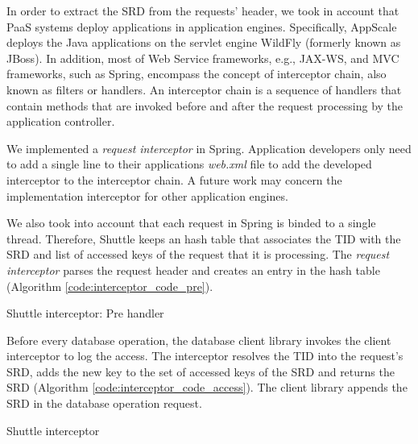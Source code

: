 In order to extract the \ac{SRD} from the requests' header, we took in account that \ac{PaaS} systems deploy applications in application engines. Specifically, AppScale deploys the Java applications on the servlet engine WildFly \cite{wildfly} (formerly known as JBoss). In addition, most of Web Service frameworks, e.g., \ac{JAX-WS}, and \acf{MVC} frameworks, such as Spring, encompass the concept of interceptor chain, also known as filters or handlers. An interceptor chain is a sequence of handlers that contain methods that are invoked before and after the request processing by the application controller.

We implemented a \emph{request interceptor} in Spring. Application developers only need to add a single line to their applications \emph{web.xml} file to add the developed interceptor to the interceptor chain. A future work may concern the implementation interceptor for other application engines.

We also took into account that each request in Spring is binded to a single thread. Therefore, Shuttle keeps an hash table that associates the \acf{TID} with the \acf{SRD} and list of accessed keys of the request that it is processing. The \emph{request interceptor} parses the request header and creates an entry in the hash table (Algorithm \ref{code:interceptor_code_pre}).


\begin{algorithm}
\DontPrintSemicolon{}

	\BlankLine
	\caption{Shuttle interceptor: Pre handler}
	\label{code:interceptor_code_pre}
\end{algorithm}

Before every database operation, the database client library invokes the client interceptor to log the access. The interceptor resolves the \acf{TID} into the request's \ac{SRD}, adds the new key to the set of accessed keys of the \ac{SRD} and returns the \ac{SRD} (Algorithm \ref{code:interceptor_code_access}). The client library appends the \ac{SRD} in the database operation request. 


\begin{algorithm}
\DontPrintSemicolon{}
	
\caption{Shuttle interceptor}
\label{code:interceptor_code_access}
\end{algorithm}

